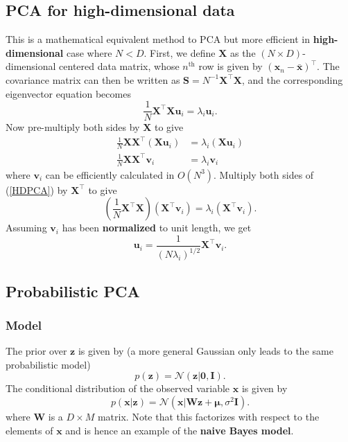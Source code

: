 \documentclass[a4paper]{report}
\newcommand{\up}{\mathrm}
\renewcommand{\bf}{\mathbf}
\renewcommand{\cal}{\mathcal}
\newcommand{\bs}{\boldsymbol}
\begin{document}
\subsection{PCA for high-dimensional data}
This is a mathematical equivalent method to PCA but more efficient in \textbf{high-dimensional} case where $N < D$. First, we define $\bf{X}$ as the $(N \times D)$-dimensional centered data matrix, whose $n^{\up{th}}$ row is given by $(\bf{x}_n-\bar{\bf{x}})^{\intercal}$. The covariance matrix can then be written as $\bf{S} = N^{-1} \bf{X}^{\intercal} \bf{X}$, and the corresponding eigenvector equation becomes
\begin{equation}
	\frac{1}{N} \bf{X}^{\intercal} \bf{X}\bf{u}_i = \lambda_i \bf{u}_i.
\end{equation}
Now pre-multiply both sides by $\bf{X}$ to give
\begin{align}
	\frac{1}{N} \bf{XX}^{\intercal} (\bf{Xu}_i) &= \lambda_i (\bf{Xu}_i) \\
	\frac{1}{N} \bf{XX}^{\intercal} \bf{v}_i &= \lambda_i \bf{v}_i \label{HDPCA}
\end{align}
where $\bf{v}_i$ can be efficiently calculated in $O(N^3)$. Multiply both sides of (\ref{HDPCA}) by $\bf{X}^{\intercal}$ to give
\begin{equation}
	\left( \frac{1}{N} \bf{X}^{\intercal}\bf{X} \right)(\bf{X}^{\intercal} \bf{v}_i) = \lambda_i (\bf{X}^{\intercal} \bf{v}_i).
\end{equation}
Assuming $\bf{v}_i$ has been \textbf{normalized} to unit length, we get
\begin{equation}
	\bf{u}_i = \frac{1}{(N\lambda_i)^{1/2}} \bf{X}^{\intercal} \bf{v}_i.
\end{equation}
\subsection{Probabilistic PCA}
\subsubsection{Model}
The prior over $\bf{z}$ is given by (a more general Gaussian only leads to the same probabilistic model)
\begin{equation}
	p(\bf{z}) = \cal{N}(\bf{z}|\bf{0},\bf{I}).
\end{equation}
The conditional distribution of the observed variable $\bf{x}$ is given by
\begin{equation}
	p(\bf{x|z}) = \cal{N}(\bf{x}|\bf{Wz}+\bs{\mu},\sigma^2\bf{I}).
\end{equation}
where $\bf{W}$ is a $D \times M$ matrix. Note that this factorizes with respect to the elements of $\bf{x}$ and is hence an example of the \textbf{naive Bayes model}.
\end{document}
